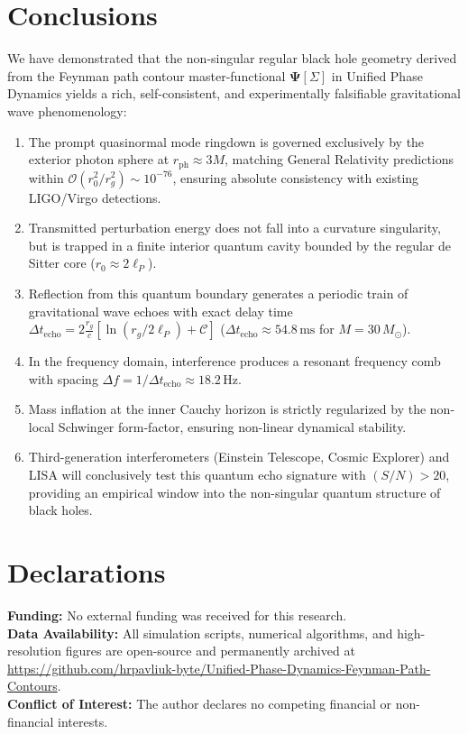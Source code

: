 \documentclass[11pt,a4paper]{article}
\begin{document}
\section{Conclusions}

We have demonstrated that the non-singular regular black hole geometry derived from the Feynman path contour master-functional $\mathbf{\Psi}[\Sigma]$ in Unified Phase Dynamics yields a rich, self-consistent, and experimentally falsifiable gravitational wave phenomenology:
\begin{enumerate}
    \item The prompt quasinormal mode ringdown is governed exclusively by the exterior photon sphere at $r_{\mathrm{ph}} \approx 3M$, matching General Relativity predictions within $\mathcal{O}(r_0^2/r_g^2) \sim 10^{-76}$, ensuring absolute consistency with existing LIGO/Virgo detections.
    \item Transmitted perturbation energy does not fall into a curvature singularity, but is trapped in a finite interior quantum cavity bounded by the regular de Sitter core ($r_0 \approx 2\ell_P$).
    \item Reflection from this quantum boundary generates a periodic train of gravitational wave echoes with exact delay time $\Delta t_{\mathrm{echo}} = 2 \frac{r_g}{c} [\ln(r_g/2\ell_P) + \mathcal{C}]$ ($\Delta t_{\mathrm{echo}} \approx 54.8\,\mathrm{ms}$ for $M = 30\,M_\odot$).
    \item In the frequency domain, interference produces a resonant frequency comb with spacing $\Delta f = 1/\Delta t_{\mathrm{echo}} \approx 18.2\,\mathrm{Hz}$.
    \item Mass inflation at the inner Cauchy horizon is strictly regularized by the non-local Schwinger form-factor, ensuring non-linear dynamical stability.
    \item Third-generation interferometers (Einstein Telescope, Cosmic Explorer) and LISA will conclusively test this quantum echo signature with $(S/N) > 20$, providing an empirical window into the non-singular quantum structure of black holes.
\end{enumerate}

\section*{Declarations}
\noindent\textbf{Funding:} No external funding was received for this research.\\
\noindent\textbf{Data Availability:} All simulation scripts, numerical algorithms, and high-resolution figures are open-source and permanently archived at \url{https://github.com/hrpavliuk-byte/Unified-Phase-Dynamics-Feynman-Path-Contours}.\\
\noindent\textbf{Conflict of Interest:} The author declares no competing financial or non-financial interests.
\end{document}
